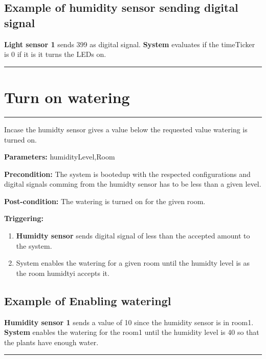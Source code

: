\subsection{Example of humidity sensor sending digital signal}
\textbf{Light sensor 1} sends 399 as digital signal. \textbf{System}
evaluates if the timeTicker is 0 if it is it turns the LEDs on.
\hfill
\vspace{0.5cm}
\hrule

\break


\section{Turn on watering}

\hrule
\hfill
\vspace{0.5cm}
\label{operation:Turn on watering}

Incase the humidty sensor gives a value below the requested value watering is
turned on.
\begin{description}
\item \textbf{Parameters:} humidityLevel,Room
\item \textbf{Precondition:} The system is bootedup with the respected
configurations and digital signals comming from the humidty sensor has to be
less than a given level.
\item \textbf{Post-condition:} The watering is turned on for the given room.

\item \textbf{Triggering:}
\begin{enumerate}
\item \textbf{Humidty sensor} sends digital signal of less than the accepted
amount to the system.
\item System enables the watering for a given room until the humidty level is
as the room humidtyi accepts it.
\end{enumerate}
\end{description}

\subsection{Example of Enabling wateringl}
\textbf{Humidity sensor 1} sends a value of 10 since the humidity sensor is in
room1.
\textbf{System} enables the watering for the room1 until the humidity level is
40 so that the plants have enough water.
\hfill
\vspace{0.5cm}
\hrule




